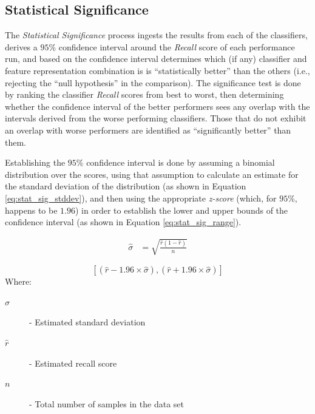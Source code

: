 \documentclass[conference]{sig-alternate-05-2015}
\begin{document}
\subsection{Statistical Significance}\label{subsec:stat_significance}
The \textit{Statistical Significance} process ingests the results from each of
the classifiers, derives a $95$\% confidence interval around the \textit{Recall}
score of each performance run, and based on the confidence interval determines
which (if any) classifier and feature representation combination is is
``statistically better'' than the others (i.e., rejecting the
``null hypothesis'' in the comparison). The significance test is done by ranking
the classifier \textit{Recall} scores from best to worst, then determining
whether the confidence interval of the better performers sees any overlap with
the intervals derived from the worse performing classifiers. Those that do not
exhibit an overlap with worse performers are identified as ``significantly
better'' than them.\par

Establishing the $95\%$ confidence interval is done by
assuming a binomial distribution over the scores, using that assumption to
calculate an estimate for the standard deviation of the distribution (as shown
in Equation \ref{eq:stat_sig_stddev}), and then using the appropriate
\textit{z-score} (which, for $95\%$, happens to be $1.96$) in order to establish
the lower and upper bounds of the confidence interval (as shown in Equation
\ref{eq:stat_sig_range}).\par

\noindent\hrulefill
\begin{equation}
  \label{eq:stat_sig_stddev}
  \begin{aligned}
    \hat{\sigma} &= \sqrt{\frac{\hat{r}(1-\hat{r})}{n}}
  \end{aligned}
\end{equation}

\begin{equation}
  \label{eq:stat_sig_range}
  [(\hat{r} - 1.96 \times \hat{\sigma}), (\hat{r} + 1.96 \times \hat{\sigma})]
\end{equation}
\noindent Where:
\begin{description}
  \item[$\hat{\sigma}$] - Estimated standard deviation
  \item[$\hat{r}$] - Estimated recall score
  \item[$n$] - Total number of samples in the data set  
\end{description}
\noindent\hrulefill
\end{document}
